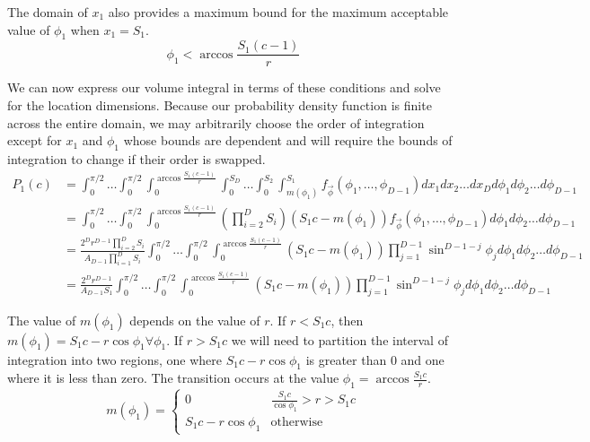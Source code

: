 \documentclass{article}
\begin{document}
The domain of $x_1$ also provides a maximum bound for the maximum acceptable value of $\phi_1$ when $x_1 = S_1$.
\begin{equation}
	\phi_1 < \arccos{\frac{S_1(c-1)}{r}}
\end{equation}

We can now express our volume integral in terms of these conditions and solve for the location dimensions. Because our probability density function is finite across the entire domain, we may arbitrarily choose the order of integration except
for $x_1$ and $\phi_1$ whose bounds are dependent and will require the bounds of integration to change if their order is swapped.
\begin{align} \label{eq:volume integral}
	P_1(c) &= \int_0^{\pi/2} \hdots \int_0^{\pi/2} \int_0^{\arccos{\frac{S_1(c-1)}{r}}}\int_0^{S_D} \hdots \int_0^{S_2} \int_{m(\phi_1)}^{S_1} f_{\vec\phi}(\phi_1,\hdots,\phi_{D-1})dx_1 dx_2 \hdots dx_D d\phi_1 d\phi_2 \hdots d\phi_{D-1}\\
	&= \int_0^{\pi/2} \hdots \int_0^{\pi/2}\int_0^{\arccos{\frac{S_1(c-1)}{r}}}\left(\prod_{i=2}^DS_i\right)\left(S_1c-m(\phi_1)\right)  f_{\vec\phi}(\phi_1,\hdots,\phi_{D-1}) d\phi_1 d\phi_2 \hdots d\phi_{D-1} \\
	&= \frac{ 2^Dr^{D-1} \prod_{i=2}^DS_i}{A_{D-1}\prod_{i=1}^DS_i}\int_0^{\pi/2} \hdots \int_0^{\pi/2}\int_0^{\arccos{\frac{S_1(c-1)}{r}}} (S_1c-m(\phi_1)) \prod_{j=1}^{D-1}\sin^{D-1-j}\phi_j d\phi_1 d\phi_2\hdots d\phi_{D-1}\\
	&= \frac{ 2^Dr^{D-1}}{A_{D-1}S_1}\int_0^{\pi/2} \hdots \int_0^{\pi/2}\int_0^{\arccos{\frac{S_1(c-1)}{r}}} (S_1c-m(\phi_1)) \prod_{j=1}^{D-1}\sin^{D-1-j}\phi_j d\phi_1 d\phi_2 \hdots d\phi_{D-1}
\end{align}

The value of $m(\phi_1)$ depends on the value of $r$. If $r<S_1c$, then $m(\phi_1)=S_1c-r\cos \phi_1 \forall \phi_1$. If $r>S_1c$ we will need to partition the interval of integration into
two regions, one where $S_1c-r\cos{\phi_1}$ is greater than 0 and one where it is less than zero. The transition occurs at the value $\phi_1 = \arccos{\frac{S_1c}{r}}$.
\begin{equation}
	m(\phi_1) = \begin{cases}
		0 & \frac{S_1c}{\cos\phi_1}>r>S_1c\\
		S_1c - r\cos{\phi_1} & \text{otherwise}
	\end{cases}
\end{equation}
\end{document}
